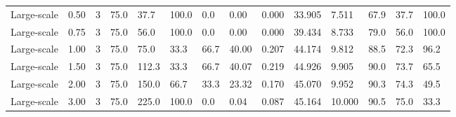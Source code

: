 \begin{longtable}{llrlllllllllll}
Large-scale & 0.50 & 3 & 75.0 & 37.7 & 100.0 & 0.0 & 0.00 & 0.000 & 33.905 & 7.511 & 67.9 & 37.7 & 100.0 \\
Large-scale & 0.75 & 3 & 75.0 & 56.0 & 100.0 & 0.0 & 0.00 & 0.000 & 39.434 & 8.733 & 79.0 & 56.0 & 100.0 \\
Large-scale & 1.00 & 3 & 75.0 & 75.0 & 33.3 & 66.7 & 40.00 & 0.207 & 44.174 & 9.812 & 88.5 & 72.3 & 96.2 \\
Large-scale & 1.50 & 3 & 75.0 & 112.3 & 33.3 & 66.7 & 40.07 & 0.219 & 44.926 & 9.905 & 90.0 & 73.7 & 65.5 \\
Large-scale & 2.00 & 3 & 75.0 & 150.0 & 66.7 & 33.3 & 23.32 & 0.170 & 45.070 & 9.952 & 90.3 & 74.3 & 49.5 \\
Large-scale & 3.00 & 3 & 75.0 & 225.0 & 100.0 & 0.0 & 0.04 & 0.087 & 45.164 & 10.000 & 90.5 & 75.0 & 33.3 \\
\end{longtable}

